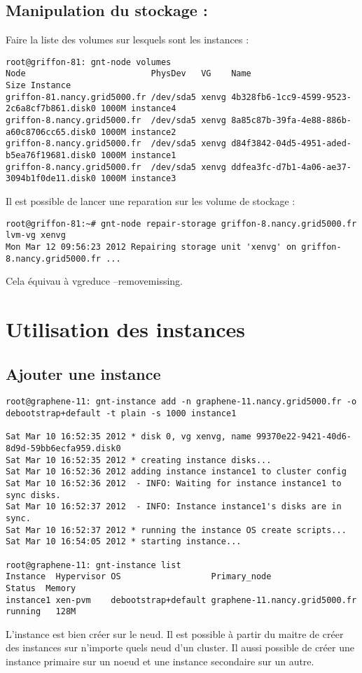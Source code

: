 \subsection{Manipulation du stockage :}

Faire la liste des volumes sur lesquels sont les instances : 
\begin{lstlisting}
root@griffon-81: gnt-node volumes
Node                         PhysDev   VG    Name                                        Size Instance 
griffon-81.nancy.grid5000.fr /dev/sda5 xenvg 4b328fb6-1cc9-4599-9523-2c6a8cf7b861.disk0 1000M instance4
griffon-8.nancy.grid5000.fr  /dev/sda5 xenvg 8a85c87b-39fa-4e88-886b-a60c8706cc65.disk0 1000M instance2
griffon-8.nancy.grid5000.fr  /dev/sda5 xenvg d84f3842-04d5-4951-aded-b5ea76f19681.disk0 1000M instance1
griffon-8.nancy.grid5000.fr  /dev/sda5 xenvg ddfea3fc-d7b1-4a06-ae37-3094b1f0de11.disk0 1000M instance3
\end{lstlisting}
Il est possible de lancer une reparation sur les volume de stockage :
\begin{lstlisting}
root@griffon-81:~# gnt-node repair-storage griffon-8.nancy.grid5000.fr lvm-vg xenvg
Mon Mar 12 09:56:23 2012 Repairing storage unit 'xenvg' on griffon-8.nancy.grid5000.fr ...
\end{lstlisting}
Cela équivau à vgreduce --removemissing.
\section{Utilisation des instances}

\subsection{Ajouter une instance}
\begin{lstlisting}
root@graphene-11: gnt-instance add -n graphene-11.nancy.grid5000.fr -o debootstrap+default -t plain -s 1000 instance1

Sat Mar 10 16:52:35 2012 * disk 0, vg xenvg, name 99370e22-9421-40d6-8d9d-59bb6ecfa959.disk0
Sat Mar 10 16:52:35 2012 * creating instance disks...
Sat Mar 10 16:52:36 2012 adding instance instance1 to cluster config
Sat Mar 10 16:52:36 2012  - INFO: Waiting for instance instance1 to sync disks.
Sat Mar 10 16:52:37 2012  - INFO: Instance instance1's disks are in sync.
Sat Mar 10 16:52:37 2012 * running the instance OS create scripts...
Sat Mar 10 16:54:05 2012 * starting instance...

root@graphene-11: gnt-instance list
Instance  Hypervisor OS                  Primary_node                  Status  Memory
instance1 xen-pvm    debootstrap+default graphene-11.nancy.grid5000.fr running   128M
\end{lstlisting}
L'instance est bien créer sur le neud. Il est possible à partir du maitre de créer des instances sur n'importe quels neud d'un cluster. Il aussi possible de créer une instance primaire sur un noeud et une instance secondaire sur un autre.

